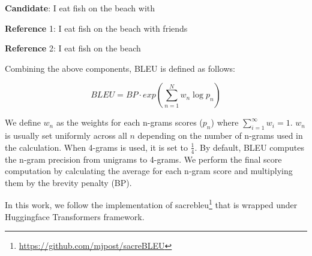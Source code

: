 \bigskip

\textbf{Candidate}: I eat fish on the beach with

\textbf{Reference} 1: I eat fish on the beach with friends

\textbf{Reference} 2: I eat fish on the beach

\bigskip

Combining the above components, BLEU is defined as follows:

\begin{equation}
    BLEU=BP\cdot exp\left( \sum_{n=1}^{N} w_n \log p_n \right)
\end{equation}

We define $w_n$ as the weights for each n-grams scores ($p_n$) where $\sum^{\infty}_{i=1} w_i = 1$. $w_n$ is usually set uniformly across all $n$ depending on the number of n-grams used in the calculation. When 4-grams is used, it is set to $\frac{1}{4}$. By default, BLEU computes the n-gram precision from unigrams to 4-grams. We perform the final score computation by calculating the average for each n-gram score and multiplying them by the brevity penalty (BP).

In this work, we follow the implementation of sacrebleu\footnote{\url{https://github.com/mjpost/sacreBLEU}}  that is wrapped under Huggingface Transformers framework.